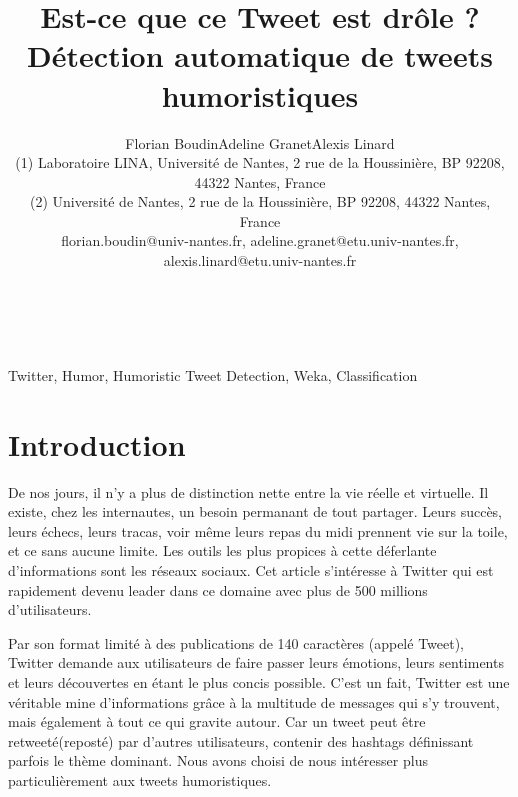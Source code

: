 \documentclass[10pt,a4paper,twoside]{article}
\title{Est-ce que ce Tweet est drôle ? Détection automatique de tweets humoristiques}
\author{Florian Boudin\up{1}\quad Adeline Granet\up{2}\quad Alexis Linard\up{2}\\
  (1) Laboratoire LINA, Université de Nantes, 2 rue de la Houssinière, BP 92208, 44322 Nantes, France \\ 
  (2) Université de Nantes, 2 rue de la Houssinière, BP 92208, 44322 Nantes, France\\ 
  florian.boudin@univ-nantes.fr, adeline.granet@etu.univ-nantes.fr, alexis.linard@etu.univ-nantes.fr \\ 
}
\begin{document}
\maketitle


\\

\\

{Twitter, Humor, Humoristic Tweet Detection, Weka, Classification}


\cleardoublepage

\section{Introduction}


De nos jours, il n’y a plus de distinction nette entre la vie réelle et virtuelle. Il existe, chez les internautes, un besoin permanant de tout partager. Leurs succès, leurs échecs, leurs tracas, voir même leurs repas du midi prennent vie sur la toile, et ce sans aucune limite. Les outils les plus propices à cette déferlante d’informations sont les réseaux sociaux. Cet article s'intéresse à Twitter qui est rapidement devenu leader dans ce domaine avec plus de 500 millions d’utilisateurs.

Par son format limité à des publications de 140 caractères (appelé Tweet), Twitter demande aux utilisateurs de faire passer leurs émotions, leurs sentiments et leurs découvertes en étant le plus concis possible. C’est un fait, Twitter est une véritable mine d’informations grâce à la multitude de messages qui s'y trouvent, mais également à tout ce qui gravite autour. Car un tweet peut être retweeté(reposté) par d'autres utilisateurs, contenir des hashtags définissant parfois le thème dominant.  Nous avons choisi de nous intéresser plus particulièrement aux tweets humoristiques.
\end{document}
